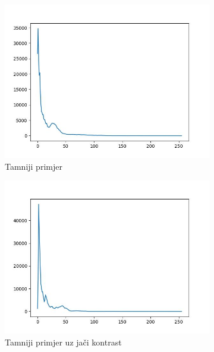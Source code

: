 \documentclass[times, utf8, diplomski]{fer}
\begin{document}
\begin{figure}[H]
     \centering
     \begin{subfigure}[b]{0.4\textwidth}
         \centering
         \includegraphics[width=\textwidth]{figures/ce_examples/1/hist_original.jpg}
         \caption{Tamniji primjer}
     \end{subfigure}
     \begin{subfigure}[b]{0.4\textwidth}
         \centering
         \includegraphics[width=\textwidth]{figures/ce_examples/2/hist_original.jpg}
         \caption{Tamniji primjer uz jači kontrast}
     \end{subfigure}
     \begin{subfigure}[b]{0.4\textwidth}

\end{subfigure}
\end{figure}
\end{document}

